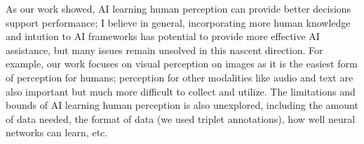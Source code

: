 As our work showed, AI learning human perception can provide better decisions support performance; I believe in general, incorporating more human knowledge and intution to AI frameworks has potential to provide more effective AI assistance, but many issues remain unsolved in this nascent direction. 
For example, our work focuses on visual perception on images as it is the easiest form of perception for humans; perception for other modalities like audio and text are also important but much more difficult to collect and utilize. The limitations and bounds of AI learning human perception is also unexplored, including the amount of data needed, the format of data (we used triplet annotations), how well neural networks can learn, etc.










